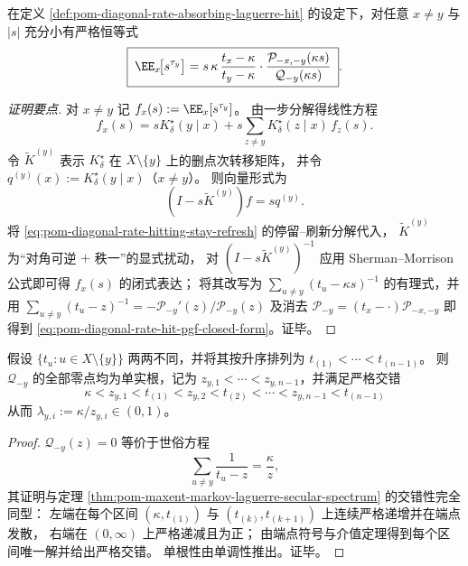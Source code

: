 \begin{theorem}\label{thm:pom-diagonal-rate-absorbing-hit-pgf}
在定义 \ref{def:pom-diagonal-rate-absorbing-laguerre-hit} 的设定下，对任意 \(x\ne y\) 与 \(|s|\) 充分小有严格恒等式
\begin{equation}\label{eq:pom-diagonal-rate-hit-pgf-closed-form}
\boxed{\;
\EE_x\!\big[s^{\tau_y}\big]
=
s\,\kappa\,\frac{t_x-\kappa}{t_y-\kappa}\cdot
\frac{\mathcal P_{-x,-y}(\kappa s)}{\mathcal Q_{-y}(\kappa s)}\; } .
\end{equation}
\end{theorem}
\begin{proof}[证明要点]
对 \(x\ne y\) 记 \(f_x(s):=\EE_x[s^{\tau_y}]\)。
由一步分解得线性方程
\[
f_x(s)=sK^\star_\delta(y\mid x)+s\sum_{z\ne y}K^\star_\delta(z\mid x)\,f_z(s).
\]
令 \(\widetilde K^{(y)}\) 表示 \(K^\star_\delta\) 在 \(X\setminus\{y\}\) 上的删点次转移矩阵，
并令 \(q^{(y)}(x):=K^\star_\delta(y\mid x)\)（\(x\ne y\)）。
则向量形式为
\[
(I-s\widetilde K^{(y)})f=sq^{(y)}.
\]
将 \eqref{eq:pom-diagonal-rate-hitting-stay-refresh} 的停留--刷新分解代入，
\(\widetilde K^{(y)}\) 为“对角可逆 \(+\) 秩一”的显式扰动，
对 \((I-s\widetilde K^{(y)})^{-1}\) 应用 Sherman--Morrison 公式即可得 \(f_x(s)\) 的闭式表达；
将其改写为 \(\sum_{u\ne y}(t_u-\kappa s)^{-1}\) 的有理式，并用
\(
\sum_{u\ne y}(t_u-z)^{-1}=-\mathcal P_{-y}'(z)/\mathcal P_{-y}(z)
\)
及消去 \(\mathcal P_{-y}=(t_x-\cdot)\mathcal P_{-x,-y}\) 即得到 \eqref{eq:pom-diagonal-rate-hit-pgf-closed-form}。证毕。
\end{proof}

\begin{theorem}\label{thm:pom-diagonal-rate-absorbing-laguerre-interlacing}
假设 \(\{t_u:u\in X\setminus\{y\}\}\) 两两不同，并将其按升序排列为
\(
t_{(1)}<\cdots<t_{(n-1)}
\)。
则 \(\mathcal Q_{-y}\) 的全部零点均为单实根，记为
\(
z_{y,1}<\cdots<z_{y,n-1}
\)，并满足严格交错
\begin{equation}\label{eq:pom-diagonal-rate-absorbing-interlacing}
\boxed{\;
\kappa<z_{y,1}<t_{(1)}<z_{y,2}<t_{(2)}<\cdots<z_{y,n-1}<t_{(n-1)}\;}
\end{equation}
从而 \(\lambda_{y,i}:=\kappa/z_{y,i}\in(0,1)\)。
\end{theorem}
\begin{proof}
\(\mathcal Q_{-y}(z)=0\) 等价于世俗方程
\[
\sum_{u\ne y}\frac{1}{t_u-z}=\frac{\kappa}{z},
\]
其证明与定理 \ref{thm:pom-maxent-markov-laguerre-secular-spectrum} 的交错性完全同型：
左端在每个区间 \((\kappa,t_{(1)})\) 与 \((t_{(k)},t_{(k+1)})\) 上连续严格递增并在端点发散，
右端在 \((0,\infty)\) 上严格递减且为正；
由端点符号与介值定理得到每个区间唯一解并给出严格交错。
单根性由单调性推出。证毕。
\end{proof}

